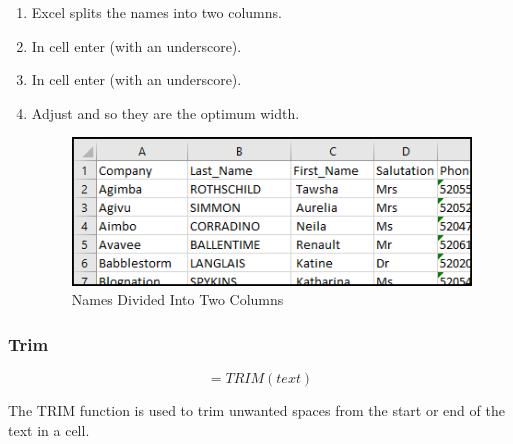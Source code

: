 \begin{enumbox}
\begin{enumerate}
		\item Excel splits the names into two columns. 
		\item In cell  enter  (with an underscore).
		\item In cell  enter  (with an underscore).
		\item Adjust  and  so they are the optimum width.
		
		\begin{figure}[H]
			\centering
			\includegraphics[width=\maxwidth{.95\linewidth}]{gfx/ch09_fig33}
			\caption{Names Divided Into Two Columns}
			\label{09:fig33}
		\end{figure}
	\end{enumerate}
\end{enumbox}
	
\subsubsection{Trim}

\[ =TRIM(text) \]

The TRIM function is used to trim unwanted spaces from the start or end of the text in a cell.


